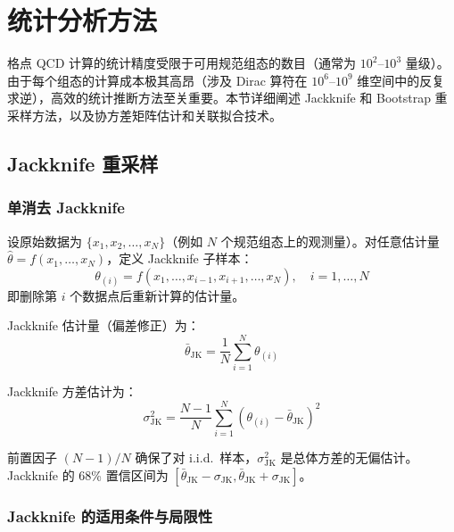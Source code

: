 \documentclass[11pt,a4paper]{ctexart}
\begin{document}
\section{统计分析方法}

格点 QCD 计算的统计精度受限于可用规范组态的数目（通常为 $10^2\text{--}10^3$ 量级）。由于每个组态的计算成本极其高昂（涉及 Dirac 算符在 $10^6\text{--}10^9$ 维空间中的反复求逆），高效的统计推断方法至关重要。本节详细阐述 Jackknife 和 Bootstrap 重采样方法，以及协方差矩阵估计和关联拟合技术。

\subsection{Jackknife 重采样}

\subsubsection{单消去 Jackknife}

设原始数据为 $\{x_1, x_2, \ldots, x_N\}$（例如 $N$ 个规范组态上的观测量）。对任意估计量 $\hat{\theta} = f(x_1, \ldots, x_N)$，定义 Jackknife 子样本：
\begin{equation}
\theta_{(i)} = f(x_1, \ldots, x_{i-1}, x_{i+1}, \ldots, x_N), \quad i = 1,\ldots,N
\end{equation}
即删除第 $i$ 个数据点后重新计算的估计量。

Jackknife 估计量（偏差修正）为：
\begin{equation}
\bar{\theta}_{\text{JK}} = \frac{1}{N} \sum_{i=1}^{N} \theta_{(i)}
\end{equation}

Jackknife 方差估计为：
\begin{equation}
\sigma_{\text{JK}}^2 = \frac{N-1}{N} \sum_{i=1}^{N} (\theta_{(i)} - \bar{\theta}_{\text{JK}})^2
\end{equation}

前置因子 $(N-1)/N$ 确保了对 i.i.d.\ 样本，$\sigma_{\text{JK}}^2$ 是总体方差的无偏估计。Jackknife 的 68\% 置信区间为 $[\bar{\theta}_{\text{JK}} - \sigma_{\text{JK}}, \bar{\theta}_{\text{JK}} + \sigma_{\text{JK}}]$。

\subsubsection{Jackknife 的适用条件与局限性}
\end{document}
